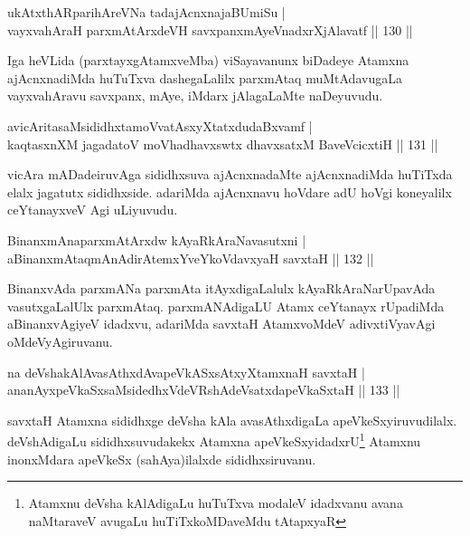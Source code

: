 \begin{shl}
ukAtxthARparihAreVNa tadajAcnxnajaBUmiSu |\\
vayxvahAraH parxmAtArxdeVH savxpanxmAyeVnadxrXjAlavatf \hfill || 130 ||
\end{shl}

\begin{artha}%
Iga heVLida (parxtayxgAtamxveMba) viSayavanunx biDadeye Atamxna ajAcnxnadiMda huTuTxva dashegaLalilx parxmAtaq muMtAdavugaLa vayxvahAravu savxpanx, mAye, iMdarx jAlagaLaMte naDeyuvudu.
\end{artha}

\begin{shl}
avicAritasaMsididhxtamoVvatAsxyXtatxdudaBxvamf |\\
kaqtasxnXM jagadatoV moVhadhavxswtx dhavxsatxM BaveVcicxtiH \hfill || 131 ||
\end{shl}

\begin{artha}
vicAra mADadeiruvAga sididhxsuva ajAcnxnadaMte ajAcnxnadiMda huTiTxda elalx jagatutx sididhxside. adariMda ajAcnxnavu hoVdare adU hoVgi koneyalilx ceYtanayxveV Agi uLiyuvudu.
\end{artha}

\begin{shl}
BinanxmAnaparxmAtArxdw kAyaRkAraNavasutxni |\\
aBinanxmAtaqmAnAdirAtemxYveYkoV\s davxyaH savxtaH \hfill || 132 ||
\end{shl}

\begin{artha}
BinanxvAda parxmANa parxmAta itAyxdigaLalulx kAyaRkAraNarUpavAda vasutxgaLalUlx parxmAtaq. parxmANAdigaLU Atamx ceYtanayx rUpadiMda aBinanxvAgiyeV idadxvu, adariMda savxtaH AtamxvoMdeV adivxtiVyavAgi oMdeVyAgiruvanu.
\end{artha}


\begin{shl}
na deVshakAlAvasAthxdAvapeVkASx\s sAtxyXtamxnaH  savxtaH |\\
ananAyxpeVkaSxsaMsidedhxVdeVRshAdeVsatxdapeVkaSxtaH \hfill || 133 ||
\end{shl}

\begin{artha}
savxtaH Atamxna sididhxge deVsha kAla avasAthxdigaLa apeVkeSxyiruvudilalx. deVshAdigaLu sididhxsuvudakekx Atamxna apeVkeSxyidadxrU\footnote[1]{Atamxnu deVsha kAlAdigaLu huTuTxva modaleV idadxvanu avana naMtaraveV avugaLu huTiTxkoMDaveMdu tAtapxyaR} Atamxnu inonxMdara apeVkeSx (sahAya)ilalxde sididhxsiruvanu.
\end{artha}

